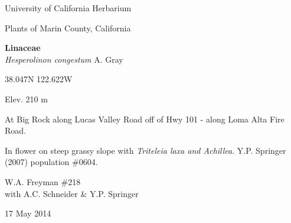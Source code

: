 \documentclass[letterpaper,10pt]{article}
\begin{document}
\begin{minipage}[t]{0.40\textwidth}

\begin{center}
University of California Herbarium \\
\begin{large}
Plants of Marin County, California \\
\end{large}
\vspace{\baselineskip}
\textbf{Linaceae} \\
\textit{Hesperolinon congestum} A. Gray\\
\end{center}

\begin{footnotesize}

\begin{multicols}{2}
38.047\textdegree N 122.622\textdegree W
\columnbreak
\begin{flushright}
Elev. 210 m
\end{flushright}
\end{multicols}

At Big Rock along Lucas Valley Road off of Hwy 101 - along Loma Alta Fire Road.
\vspace{\baselineskip}

In flower on steep grassy slope with \textit{Triteleia laxa and Achillea}. Y.P. Springer (2007) population \#0604.

\begin{multicols}{2}
W.A. Freyman \#218 \\
with A.C. Schneider \& Y.P. Springer
\columnbreak
\begin{flushright}
17 May 2014
\end{flushright}
\end{multicols}

\end{footnotesize}

\end{minipage}
%
\hspace{2cm}
%
\end{document}
